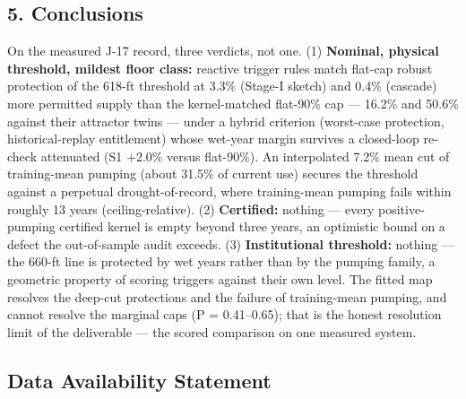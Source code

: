 \documentclass[11pt]{article}
\begin{document}
\subsection{5. Conclusions}\label{conclusions}

On the measured J-17 record, three verdicts, not one. (1)
\textbf{Nominal, physical threshold, mildest floor class:} reactive
trigger rules match flat-cap robust protection of the 618-ft threshold
at 3.3\% (Stage-I sketch) and 0.4\% (cascade) more permitted supply than
the kernel-matched flat-90\% cap --- 16.2\% and 50.6\% against their
attractor twins --- under a hybrid criterion (worst-case protection,
historical-replay entitlement) whose wet-year margin survives a
closed-loop re-check attenuated (S1 +2.0\% versus flat-90\%). An
interpolated 7.2\% mean cut of training-mean pumping (about 31.5\% of
current use) secures the threshold against a perpetual
drought-of-record, where training-mean pumping fails within roughly 13
years (ceiling-relative). (2) \textbf{Certified:} nothing --- every
positive-pumping certified kernel is empty beyond three years, an
optimistic bound on a defect the out-of-sample audit exceeds. (3)
\textbf{Institutional threshold:} nothing --- the 660-ft line is
protected by wet years rather than by the pumping family, a geometric
property of scoring triggers against their own level. The fitted map
resolves the deep-cut protections and the failure of training-mean
pumping, and cannot resolve the marginal caps (P = 0.41--0.65); that is
the honest resolution limit of the deliverable --- the scored comparison
on one measured system.

\subsection{Data Availability
Statement}\label{data-availability-statement}
\end{document}
